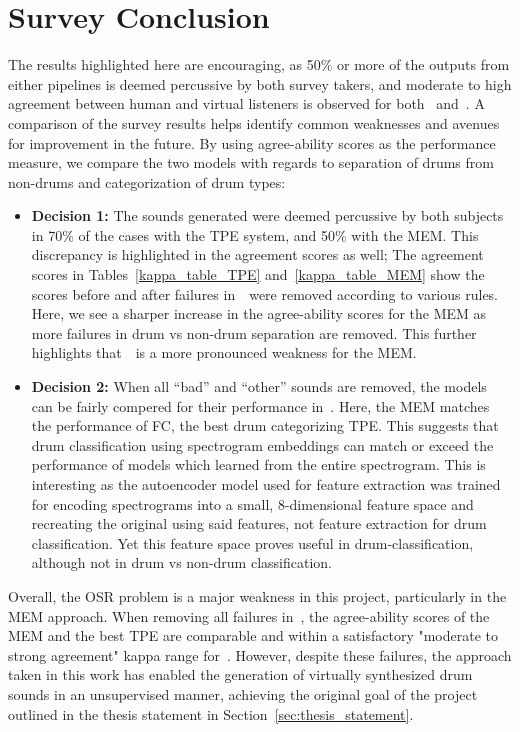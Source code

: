 \documentclass[\main/thesis.tex]{subfiles}
\begin{document}
\section{Survey Conclusion}
\label{survey-conc}
The results highlighted here are encouraging, as 50\% or more of the outputs from either pipelines is deemed percussive by both survey takers, and moderate to high agreement between human and virtual listeners is observed for both \decfirst~and~\decsecond. A comparison of the survey results helps identify common weaknesses and avenues for improvement in the future. By using agree-ability scores as the performance measure, we compare the two models with regards to separation of drums from non-drums and categorization of drum types:
\begin{itemize}
\item \textbf{Decision 1:} The sounds generated were deemed percussive by both subjects in 70\% of the cases with the TPE system, and 50\% with the MEM. This discrepancy is highlighted  in the agreement scores as well; The agreement scores in Tables~\ref{kappa_table_TPE} and~\ref{kappa_table_MEM} show the scores before and after failures in~\decfirst~were removed according to various rules. Here, we see a sharper increase in the agree-ability scores for the MEM as more failures in drum vs non-drum separation are removed. This further highlights that~\decfirst~is a more pronounced weakness for the MEM.
\item \textbf{Decision 2:} When all \enquote{bad} and \enquote{other} sounds are removed, the models can be fairly compered for their performance in~\decsecond. Here, the MEM matches the performance of FC, the best drum categorizing TPE. This suggests that drum classification using spectrogram embeddings can match or exceed the performance of models which learned from the entire spectrogram. This is interesting as the autoencoder model used for feature extraction was trained for encoding spectrograms into a small, 8-dimensional feature space and recreating the original using said features, not feature extraction for drum classification. Yet this feature space proves useful in drum-classification, although not in drum vs non-drum classification.  
\end{itemize}

Overall, the OSR problem is a major weakness in this project, particularly in the MEM approach. When removing all failures in~\decfirst, the agree-ability scores of the MEM and the best TPE are comparable and within a satisfactory "moderate to strong agreement" kappa range for~\decsecond. However, despite these failures, the approach taken in this work has enabled the generation of virtually synthesized drum sounds in an unsupervised manner, achieving the original goal of the project outlined in the thesis statement in Section~\ref{sec:thesis_statement}. 




\end{document}

